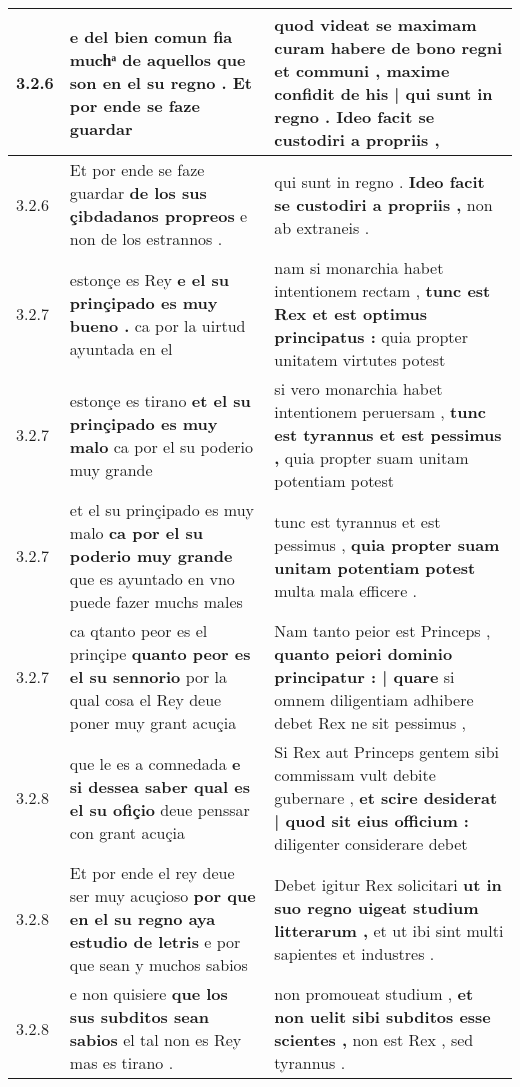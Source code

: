 \begin{tabular}{|p{1cm}|p{6.5cm}|p{6.5cm}|}
3.2.6 & e del bien comun fia muchͣ \textbf{ de aquellos que son en el su regno . } Et por ende se faze guardar & quod videat se maximam curam habere de bono regni et communi , \textbf{ maxime confidit de his | qui sunt in regno . } Ideo facit se custodiri a propriis , \\\hline
3.2.6 & Et por ende se faze guardar \textbf{ de los sus çibdadanos propreos } e non de los estrannos . & qui sunt in regno . \textbf{ Ideo facit se custodiri a propriis , } non ab extraneis . \\\hline
3.2.7 & estonçe es Rey \textbf{ e el su prinçipado es muy bueno . } ca por la uirtud ayuntada en el & nam si monarchia habet intentionem rectam , \textbf{ tunc est Rex et est optimus principatus : } quia propter unitatem virtutes potest \\\hline
3.2.7 & estonçe es tirano \textbf{ et el su prinçipado es muy malo } ca por el su poderio muy grande & si vero monarchia habet intentionem peruersam , \textbf{ tunc est tyrannus et est pessimus , } quia propter suam unitam potentiam potest \\\hline
3.2.7 & et el su prinçipado es muy malo \textbf{ ca por el su poderio muy grande } que es ayuntado en vno puede fazer muchs males & tunc est tyrannus et est pessimus , \textbf{ quia propter suam unitam potentiam potest } multa mala efficere . \\\hline
3.2.7 & ca qtanto peor es el prinçipe \textbf{ quanto peor es el su sennorio } por la qual cosa el Rey deue poner muy grant acuçia & Nam tanto peior est Princeps , \textbf{ quanto peiori dominio principatur : | quare } si omnem diligentiam adhibere debet Rex ne sit pessimus , \\\hline
3.2.8 & que le es a comnedada \textbf{ e si dessea saber qual es el su ofiçio } deue penssar con grant acuçia & Si Rex aut Princeps gentem sibi commissam vult debite gubernare , \textbf{ et scire desiderat | quod sit eius officium : } diligenter considerare debet \\\hline
3.2.8 & Et por ende el rey deue ser muy acuçioso \textbf{ por que en el su regno aya estudio de letris } e por que sean y muchos sabios & Debet igitur Rex solicitari \textbf{ ut in suo regno uigeat studium litterarum , } et ut ibi sint multi sapientes et industres . \\\hline
3.2.8 & e non quisiere \textbf{ que los sus subditos sean sabios } el tal non es Rey mas es tirano . & non promoueat studium , \textbf{ et non uelit sibi subditos esse scientes , } non est Rex , sed tyrannus . \\\hline

\end{tabular}
